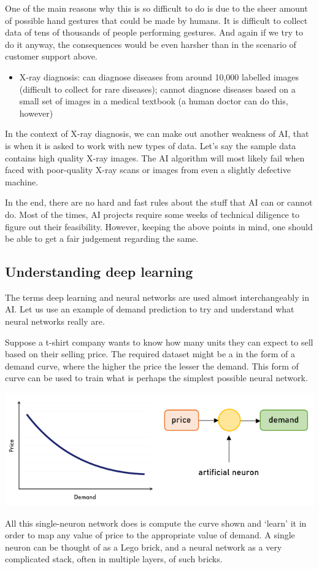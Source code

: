 \documentclass{article}[a4paper,12pt]
\theoremstyle{definition}
\begin{document}
One of the main reasons why this is so difficult to do is due to the sheer amount of possible hand gestures that could be made by humans. It is difficult to collect data of tens of thousands of people performing gestures. And again if we try to do it anyway, the consequences would be even harsher than in the scenario of customer support above.
\begin{itemize}
	\item X-ray diagnosis: can diagnose diseases from around 10,000 labelled images (difficult to collect for rare diseases); cannot diagnose diseases based on a small set of images in a medical textbook (a human doctor can do this, however)
\end{itemize}
In the context of X-ray diagnosis, we can make out another weakness of AI, that is when it is asked to work with new types of data. Let's say the sample data contains high quality X-ray images. The AI algorithm will most likely fail when faced with poor-quality X-ray scans or images from even a slightly defective machine.
\vspace{6pt}

In the end, there are no hard and fast rules about the stuff that AI can or cannot do. Most of the times, AI projects require some weeks of technical diligence to figure out their feasibility. However, keeping the above points in mind, one should be able to get a fair judgement regarding the same.
\subsection{Understanding deep learning}
The terms deep learning and neural networks are used almost interchangeably in AI. Let us use an example of demand prediction to try and understand what neural networks really are.
\vspace{6pt}

Suppose a t-shirt company wants to know how many units they can expect to sell based on their selling price. The required dataset might be a in the form of a demand curve, where the higher the price the lesser the demand. This form of curve can be used to train what is perhaps the simplest possible neural network.
\begin{center}\includegraphics{deep_learning1.png}\end{center}
All this single-neuron network does is compute the curve shown and `learn' it in order to map any value of price to the appropriate value of demand. A single neuron can be thought of as a Lego brick, and a neural network as a very complicated stack, often in multiple layers, of such bricks.
\vspace{6pt}
\end{document}
